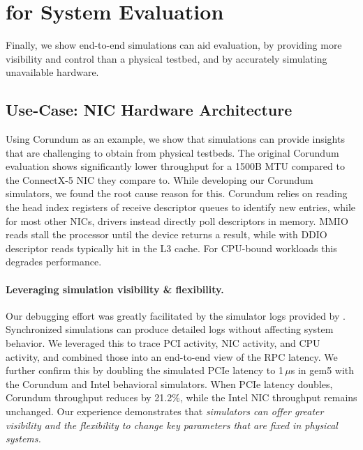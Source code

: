 \section{\sysname for System Evaluation}
Finally, we show \sysname end-to-end simulations can aid
evaluation, by providing more visibility and control than a
physical testbed, and by accurately simulating unavailable hardware.


\subsection{Use-Case: NIC Hardware Architecture}
\label{ssec:eval:corundum}
%
Using Corundum as an example, we show that \sysname simulations can
provide insights that are challenging to obtain from physical
testbeds.
%
The original Corundum evaluation shows significantly lower throughput
for a 1500B MTU compared to the ConnectX-5 NIC they compare to.
%
While developing our Corundum simulators, we found the root cause reason for
this.
%
Corundum relies on reading the head index registers of receive descriptor queues
to identify new entries, while for most other NICs, drivers instead directly
poll descriptors in memory.
%
MMIO reads stall the processor until the device returns a result,
while with DDIO descriptor reads typically hit in the L3 cache.
%
For CPU-bound workloads this degrades performance.

\paragraph{Leveraging simulation visibility \& flexibility.}
Our debugging effort was greatly facilitated by the simulator logs provided by
\sysname.
%
Synchronized simulations can produce detailed logs without affecting
system behavior.
%
We leveraged this to trace PCI activity, NIC activity, and CPU
activity, and combined those into an end-to-end view of the RPC latency.
%
We further confirm this by doubling the simulated PCIe latency to
1\,$\mu$s in gem5 with the Corundum and Intel behavioral simulators.
%
When PCIe latency doubles, Corundum throughput reduces by 21.2\%,
while the Intel NIC throughput remains unchanged.
%
Our experience demonstrates that \emph{simulators can offer greater visibility
and the flexibility to change key parameters that are fixed in physical
systems.}



